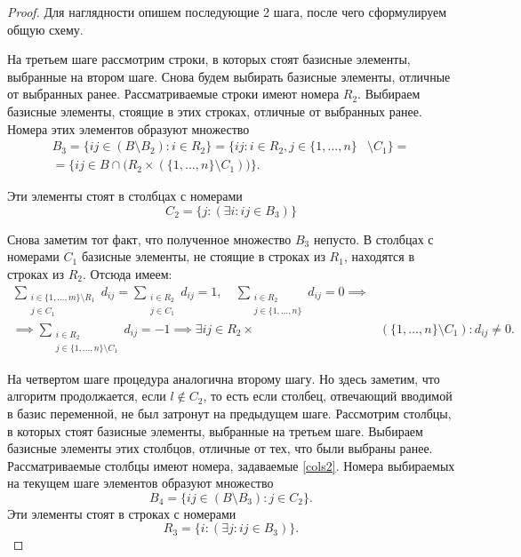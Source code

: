 \documentclass[12pt]{article}
\theoremstyle{definition}
\theoremstyle{plain}
\theoremstyle{definition}
\begin{document}
\begin{proof}
Для наглядности опишем последующие 2 шага, после чего сформулируем общую схему.

На третьем шаге рассмотрим строки, в которых стоят базисные
элементы, выбранные на втором шаге. Снова будем выбирать базисные элементы,
отличные от выбранных ранее.
Рассматриваемые строки имеют номера $R_2$.
Выбираем базисные элементы, стоящие в этих строках, отличные от выбранных ранее.
Номера этих элементов образуют множество
\begin{align*}
B_3 = \{ij \in (B \setminus B_2): i \in R_2\} =
\{ij: i \in R_2, j \in \{1,\dots,n\} & \setminus C_1 \} = \\ =
\{ij \in B \cap \bigl(R_2 \times (\{1,\dots,n\} \setminus C_1)\bigr) \} .
\end{align*}

Эти элементы стоят в столбцах с номерами
\begin{equation}\label{cols2}
C_2 = \{j: (\exists i: ij \in B_3)\}
\end{equation}

Снова заметим тот факт, что полученное множество $B_3$ непусто.
В столбцах с номерами $C_1$ базисные элементы, не стоящие в строках из $R_1$,
находятся в строках из $R_2$. Отсюда имеем:
\begin{equation}\label{b3set}
\begin{aligned}
\sum_{\substack{i \in \{1,\dots,m\} \setminus R_1 \\ j \in C_1}} d_{ij} = 
\sum_{\substack{i \in R_2 \\ j \in C_1}} d_{ij}
= 1,
\quad \sum_{\substack{i \in R_2 \\ j \in \{1,\dots,n\}}} d_{ij} = 0 \implies &\\
\implies
\sum_{\substack{i \in R_2 \\ j \in \{1,\dots,n\} \setminus C_1}} d_{ij} = -1
\implies \exists ij \in R_2 \times & (\{1,\dots,n\} \setminus C_1): d_{ij} \neq 0.
\end{aligned}
\end{equation}



На четвертом шаге процедура аналогична второму шагу. Но здесь заметим,
что алгоритм продолжается, если $l \notin C_2$, то есть если столбец, отвечающий
вводимой в базис переменной, не был затронут на предыдущем шаге.
Рассмотрим столбцы, в которых стоят базисные
элементы, выбранные на третьем шаге. Выбираем базисные элементы этих столбцов,
отличные от тех, что были выбраны ранее.
Рассматриваемые столбцы имеют номера, задаваемые \eqref{cols2}.
Номера выбираемых на текущем шаге элементов образуют множество
\[
B_4 = \{ij \in (B \setminus B_3): j \in C_2\}.
\]
Эти элементы стоят в строках с номерами
\begin{equation}\label{rows3}
R_3 = \{i: (\exists j: ij \in B_3)\}.
\end{equation}


\end{proof}
\end{document}
